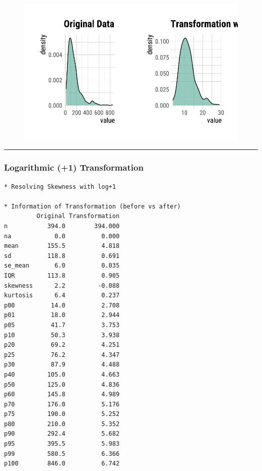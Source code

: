 \documentclass[
  letterpaper,
  DIV=11,
  numbers=noendperiod]{scrreprt}
\newenvironment{Shaded}{\begin{snugshade}}{\end{snugshade}}
\newcommand{\AttributeTok}[1]{\textcolor[rgb]{0.40,0.45,0.13}{#1}}
\newcommand{\FunctionTok}[1]{\textcolor[rgb]{0.28,0.35,0.67}{#1}}
\newcommand{\NormalTok}[1]{\textcolor[rgb]{0.00,0.23,0.31}{#1}}
\newcommand{\OtherTok}[1]{\textcolor[rgb]{0.00,0.23,0.31}{#1}}
\newcommand{\SpecialCharTok}[1]{\textcolor[rgb]{0.37,0.37,0.37}{#1}}
\newcommand{\StringTok}[1]{\textcolor[rgb]{0.13,0.47,0.30}{#1}}
\begin{document}
\begin{figure}[H]

{\centering \includegraphics{./TransformingLikeDataTrans_files/figure-pdf/unnamed-chunk-9-1.pdf}

}

\end{figure}

\begin{center}\rule{0.5\linewidth}{0.5pt}\end{center}

\hypertarget{logarithmic-1-transformation}{%
\subsubsection{Logarithmic (+1)
Transformation}\label{logarithmic-1-transformation}}

\begin{Shaded}
\end{Shaded}

\begin{verbatim}
* Resolving Skewness with log+1

* Information of Transformation (before vs after)
         Original Transformation
n           394.0        394.000
na            0.0          0.000
mean        155.5          4.818
sd          118.8          0.691
se_mean       6.0          0.035
IQR         113.8          0.905
skewness      2.2         -0.088
kurtosis      6.4          0.237
p00          14.0          2.708
p01          18.0          2.944
p05          41.7          3.753
p10          50.3          3.938
p20          69.2          4.251
p25          76.2          4.347
p30          87.9          4.488
p40         105.0          4.663
p50         125.0          4.836
p60         145.8          4.989
p70         176.0          5.176
p75         190.0          5.252
p80         210.0          5.352
p90         292.4          5.682
p95         395.5          5.983
p99         580.5          6.366
p100        846.0          6.742
\end{verbatim}
\end{document}
